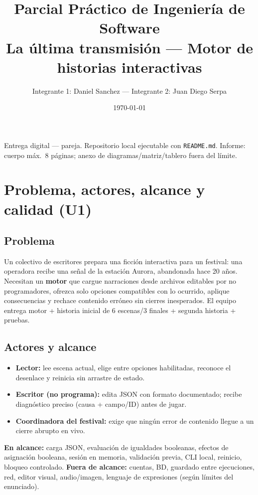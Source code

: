 \documentclass[11pt,a4paper]{article}
\title{\textbf{Parcial Pr\'actico de Ingenier\'ia de Software}\\ \large La \'ultima transmisi\'on --- Motor de historias interactivas}
\author{Integrante 1: Daniel Sanchez --- Integrante 2: Juan Diego Serpa}
\date{\today}
\begin{document}
\maketitle
\begin{center}
\small Entrega digital --- pareja. Repositorio local ejecutable con \texttt{README.md}. Informe: cuerpo m\'ax.\ 8 p\'aginas; anexo de diagramas/matriz/tablero fuera del l\'imite.
\end{center}

\tableofcontents

\section{Problema, actores, alcance y calidad (U1)}
\subsection{Problema}
Un colectivo de escritores prepara una ficci\'on interactiva para un festival: una operadora recibe una se\~nal de la estaci\'on Aurora, abandonada hace 20 a\~nos. Necesitan un \textbf{motor} que cargue narraciones desde archivos editables por no programadores, ofrezca solo opciones compatibles con lo ocurrido, aplique consecuencias y rechace contenido err\'oneo sin cierres inesperados. El equipo entrega motor + historia inicial de 6 escenas/3 finales + segunda historia + pruebas.

\subsection{Actores y alcance}
\begin{itemize}
\item \textbf{Lector:} lee escena actual, elige entre opciones habilitadas, reconoce el desenlace y reinicia sin arrastre de estado.
\item \textbf{Escritor (no programa):} edita JSON con formato documentado; recibe diagn\'ostico preciso (causa + campo/ID) antes de jugar.
\item \textbf{Coordinadora del festival:} exige que ning\'un error de contenido llegue a un cierre abrupto en vivo.
\end{itemize}
\textbf{En alcance:} carga JSON, evaluaci\'on de igualdades booleanas, efectos de asignaci\'on booleana, sesi\'on en memoria, validaci\'on previa, CLI local, reinicio, bloqueo controlado. \textbf{Fuera de alcance:} cuentas, BD, guardado entre ejecuciones, red, editor visual, audio/imagen, lenguaje de expresiones (seg\'un l\'imites del enunciado).
\end{document}
